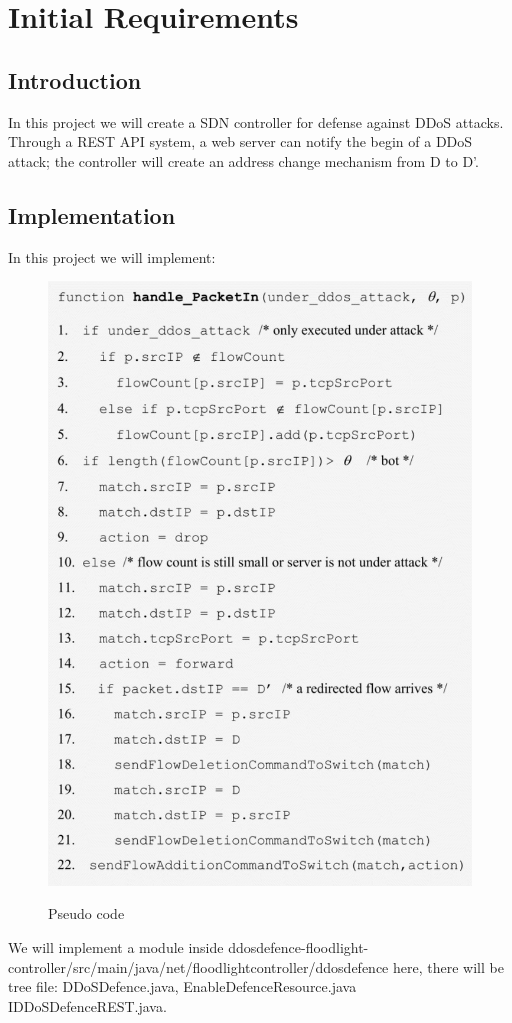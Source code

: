 \chapter{Initial Requirements}

\section{Introduction}
In this project we will create a SDN controller for defense against DDoS attacks. Through a REST API system, a web server can notify the begin of a DDoS attack; the controller will create an address change mechanism from D to D’.

\section{Implementation}
In this project we will implement:

\begin{figure}[H]
\begin{center}
\includegraphics[width=\textwidth]{../images/PseudoCode.png}
\label{fig:pseudocode}
\caption{Pseudo code}
\end{center}
\end{figure}

We will implement a module inside ddosdefence-floodlight-controller/src/main/java/net/floodlightcontroller/ddosdefence here, there will be tree file: DDoSDefence.java, EnableDefenceResource.java IDDoSDefenceREST.java.
